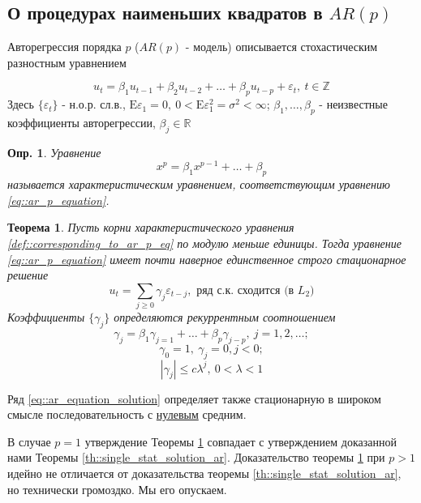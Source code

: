 \documentclass[12pt]{article}
\newtheorem{definition}{Опр.}
\newtheorem{theorem}{Теорема}
\def\eps{ \varepsilon }
\def\R{ \mathbb{R} }
\def\Z{ \mathbb{Z} }
\def\E{ \mathrm{E} }
\begin{document}
\newpage
\subsection{О процедурах наименьших квадратов в $AR(p)$}
Авторегрессия порядка $p$ ($AR(p)$ - модель) описывается
стохастическим разностным уравнением

\begin{equation}\label{eq::ar_p_equation}
    u_t=\beta_1u_{t-1}+\beta_2u_{t-2}+\ldots+\beta_pu_{t-p}+\eps_t,\ t\in\Z
\end{equation}
Здесь $\{\eps_t\}$ - н.о.р. сл.в., $\E\eps_1=0,\ 0<\E\eps_1^2=\sigma^2<\infty$;
$\beta_1,\ldots,\beta_p$ - неизвестные коэффициенты авторегрессии, $\beta_j\in\R$
\begin{definition}
    Уравнение
    \begin{equation} \label{def::corresponding_to_ar_p_eq}
        x^p=\beta_1x^{p-1}+\ldots+\beta_p
    \end{equation}
    называется характеристическим уравнением, соответствующим уравнению \eqref{eq::ar_p_equation}.
\end{definition}
\begin{theorem}\label{th::single_stat_solution_ar_p}
    Пусть корни характеристического уравнения \eqref{def::corresponding_to_ar_p_eq} по
    модулю меньше единицы. Тогда уравнение \eqref{eq::ar_p_equation} имеет
    почти наверное единственное строго стационарное решение
    \begin{equation}\label{eq::ar_p_equation_solution}
            u_t=\sum_{j\geq0}\gamma_j\eps_{t-j},\text{ ряд с.к. сходится (в $L_2$)}
    \end{equation} 
    Коэффициенты $\{\gamma_j\}$ определяются рекуррентным соотношением
    \[\gamma_j=\beta_1\gamma_{j=1}+\ldots+\beta_p\gamma_{j-p},\ j=1,2,\ldots;\]
    \[\gamma_0=1,\ \gamma_j=0, j<0;\]
    \[\left\lvert \gamma_j\right\rvert \leq c\lambda^j,\ 0<\lambda<1\]
\end{theorem}

Ряд \eqref{eq::ar_equation_solution} определяет также стационарную в
широком смысле последовательность с \underline{нулевым} средним.

В случае $p=1$ утверждение Теоремы \ref{th::single_stat_solution_ar_p} совпадает
с утверждением доказанной нами Теоремы \ref{th::single_stat_solution_ar}.
Доказательство теоремы \ref{th::single_stat_solution_ar_p} при $p>1$
идейно не отличается от доказательства теоремы \ref{th::single_stat_solution_ar},
но технически громоздко. Мы его опускаем.
\end{document}
